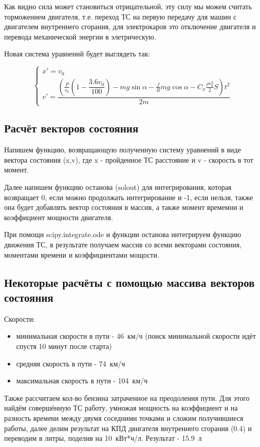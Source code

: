 \documentclass[A4paper,12pt]{article}
\theoremstyle{plain} %
\theoremstyle{definition} %
\theoremstyle{remark} %
\begin{document}
Как видно сила может становиться отрицательной, эту силу мы можем считать торможением двигателя, т.е. переход ТС на первую передачу для машин с двигателем внутреннего сгорания, для электрокаров это отключение двигателя и перевода механической энергии в элетрическую.

Новая система уравнений будет выглядеть так:

\[
\begin{cases}
x' = v_0\\
v' = \dfrac{(\frac{P}{v_0}(1-\dfrac{3.6v_0}{100})-mg\sin{\alpha} - \frac{f}{R}mg\cos{\alpha} - C_x\frac{\rho v_0^2}{2}S)t^2}{2m}
\end{cases}
\]
\subsection*{Расчёт векторов состояния}
Напишем функцию, возвращающую полученную систему уравнений в виде вектора состояния (x,v), где x - пройденное ТС расстояние и v - скорость в тот момент.

Далее напишем функцию останова (solout) для интегрирования, которая возвращает 0, если можно продолжать интегрирование и -1, если нельзя, также она будет добавлять вектор состояния в массив, а также момент времемни и коэффициент мощности двигателя.

При помощи scipy.integrate.ode и функции останова интегрируем функцию движения ТС, в результате получаем массив со всеми векторами состояния, моментами времени и коэффициентами мощости.
\newpage
\subsection*{Некоторые расчёты с помощью массива векторов состояния}
Скорости:
\begin{itemize}
    \item минимальная скорости в пути - 46~км/ч (поиск минимальной скорости идёт спустя 10 минут после старта)
    \item средняя скорость в пути - 74~км/ч 
    \item максимальная скорость в пути - 104~км/ч
\end{itemize}

Также рассчитаем кол-во бензина затраченное на преодоления пути. Для этого найдём совершённую ТС работу, умножая мощность на коэффициент и на разность времени между двумя соседними точками и сложим получившиеся работы, далее делим результат на КПД двигателя внутреннего сгорания (0.4) и переводим в литры, поделив на 10~кВт*ч/л. Результат - 15.9~л
\newpage
\end{document}
